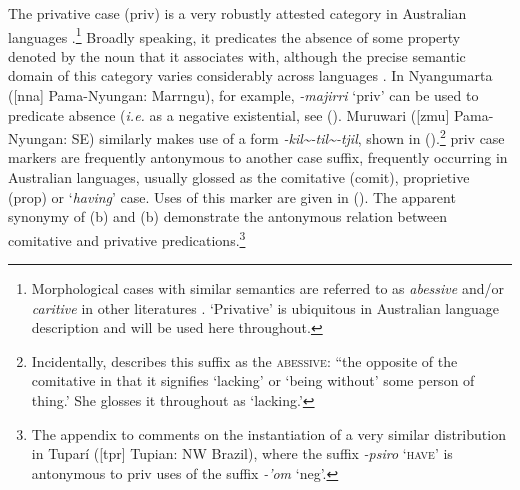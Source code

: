 The privative case (\gls{priv}) is a very robustly attested category in Australian languages \citep[84]{Dixon2002a}.\footnote{Morphological cases with similar semantics are referred to as \textit{abessive} and/or \textit{caritive} in other literatures \citep[\textit{e.g.} for Uralic in][]{Hamari2011,Hamari2015,Tamm2015}. `Privative' is ubiquitous in Australian language description and will be used here throughout.} Broadly speaking, it predicates the absence of some property denoted by the noun that it associates with, although the precise semantic domain of this category varies considerably across languages \citep[\textit{cf.} arguments for the predicative status of negative existential markers in ][139]{Veselinova2013}. In Nyangumarta ([\gls{nna}] Pama-Nyungan: Marrngu), for example, \textit{-majirri} `\gls{priv}' can be used to predicate absence (\textit{i.e.} as a negative existential, see (). Muruwari ([\gls{zmu}] Pama-Nyungan: SE) similarly makes use of a form \textit{-kil\textasciitilde-til\textasciitilde-tjil}, shown in ().\footnote{Incidentally, \citet[77]{Oates1988} describes this suffix as the \textsc{abessive}: ``the opposite of the comitative in that it signifies `lacking' or `being without' some person of thing.' She glosses it throughout as `lacking.'}
\gls{priv} case markers are frequently antonymous to another case suffix, frequently occurring in Australian languages, usually glossed as the comitative (\gls{comit}), proprietive (\gls{prop}) or `\textit{having}' case. Uses of this marker are given in (). The apparent synonymy of (b) and (b) demonstrate the antonymous relation between comitative and privative predications.\footnote{The appendix to \citet{Singerman2018} comments on the instantiation of a very similar distribution in Tuparí ([\gls{tpr}] Tupian: NW Brazil), where the suffix \textit{-psiro} \textsc{`have'} is antonymous to \gls{priv} uses of the suffix \textit{-'om} `\gls{neg}'. }


